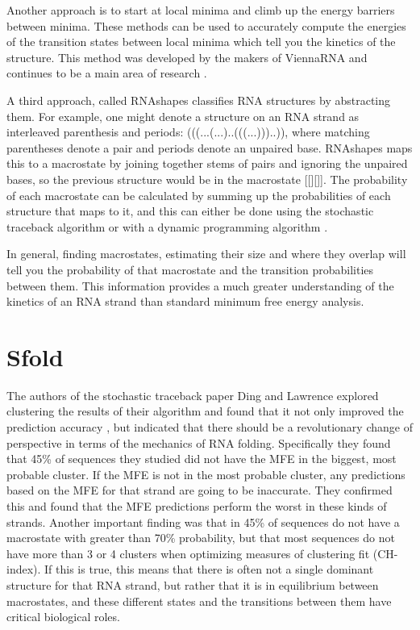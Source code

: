 Another approach is to start at local minima and climb up the energy
barriers between minima. These methods can be used to accurately
compute the energies of the transition states between local minima
which tell you the kinetics of the structure. This method was developed
by the makers of ViennaRNA and continues to be a main area of research
\cite{PhysRevE.83.011113} \cite{wolfinger2004efficient} .

A third approach, called RNAshapes classifies RNA structures by
abstracting them. For example, one might denote a structure on an RNA
strand as interleaved parenthesis and periods:
(((...(...)..(((...)))..)), where matching parentheses denote a pair
and periods denote an unpaired base. RNAshapes maps this to a
macrostate by joining together stems of pairs and ignoring the
unpaired bases, so the previous structure would be in the macrostate
[[][]]. The probability of each macrostate can be calculated by
summing up the probabilities of each structure that maps to it, and
this can either be done using the stochastic traceback algorithm or
with a dynamic programming algorithm \cite{steffen2006rnashapes}.

In general, finding macrostates, estimating their size and where they
overlap will tell you the probability of that macrostate and the
transition probabilities between them. This information provides a
much greater understanding of the kinetics of an RNA strand than
standard minimum free energy analysis. 

\section{Sfold}

The authors of the stochastic traceback paper
\cite{ding2003statistical} Ding and Lawrence explored clustering the
results of their algorithm and found that it not only improved the
prediction accuracy \cite{ding2005rna}, but indicated that there should
be a revolutionary change of perspective in terms of the mechanics of
RNA folding. Specifically they found that 45\% of sequences they studied did
not have the MFE in the biggest, most probable cluster. If the MFE is
not in the most probable cluster, any predictions based on the MFE for
that strand are going to be inaccurate. They confirmed this and found
that the MFE predictions perform the worst in these kinds of
strands. Another important finding was that in 45\% of sequences do
not have a macrostate with greater than 70\% probability, but that
most sequences do not have more than 3 or 4 clusters when optimizing
measures of clustering fit (CH-index). If this is true, this means that there is
often not a single dominant structure for that RNA strand, but rather
that it is in equilibrium between macrostates, and these different
states and the transitions between them have critical biological
roles.

